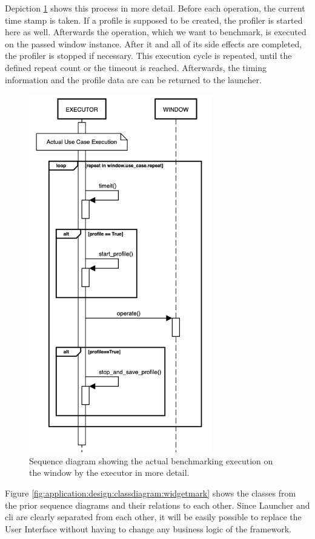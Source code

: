 Depiction \ref{fig:application:design:executor} shows this process in more
detail. Before each operation, the current time stamp is taken. If a profile is
supposed to be created, the profiler is started here as well. Afterwards the
operation, which we want to benchmark, is executed on the passed window
instance.  After it and all of its side effects are completed, the profiler is
stopped if necessary. This execution cycle is repeated, until the defined repeat
count or the timeout is reached. Afterwards, the timing information and the
profile data are can be returned to the launcher.

\begin{figure}[h]
    \centering
    \includegraphics[width=8cm]{resources/img/sequence/executor}
    \caption{
        Sequence diagram showing the actual benchmarking execution on the window
        by the executor in more detail.
    }
    \label{fig:application:design:executor}
\end{figure}

Figure \ref{fig:application:design:classdiagram:widgetmark} shows the classes
from the prior sequence diagrams and their relations to each other. Since
Launcher and \gls{cli} are clearly separated from each other, it will be easily
possible to replace the User Interface without having to change any business
logic of the framework. 

